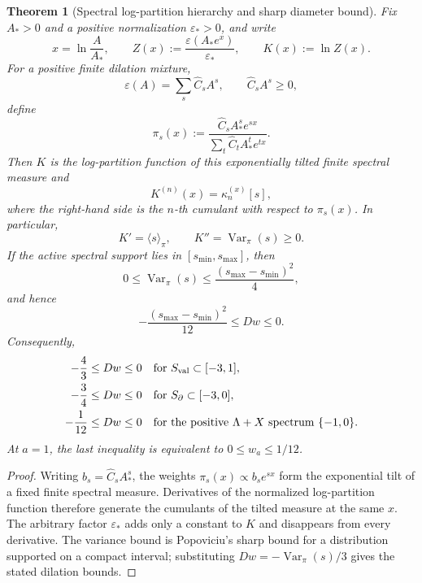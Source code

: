 \documentclass[11pt,a4paper]{article}
\def\Dil{D}%
\numberwithin{equation}{section}
\theoremstyle{definition}
\theoremstyle{plain}
\newtheorem{theorem}[criterion]{Theorem}
\theoremstyle{remark}
\newcommand{\Dil}{\mathscr{D}}
\begin{document}
\begin{theorem}[Spectral log-partition hierarchy and sharp diameter bound]
Fix \(A_*>0\) and a positive normalization \(\varepsilon_*>0\), and write
\begin{equation}
x=\ln\frac{A}{A_*},
\qquad
Z(x):=\frac{\varepsilon(A_*e^x)}{\varepsilon_*},
\qquad
K(x):=\ln Z(x).
\end{equation}
For a positive finite dilation mixture,
\begin{equation}
\varepsilon(A)=\sum_s\widehat C_sA^s,
\qquad
\widehat C_sA^s\ge0,
\end{equation}
define
\begin{equation}
\pi_s(x):=
\frac{\widehat C_sA_*^s e^{sx}}
{\sum_t\widehat C_tA_*^t e^{tx}}.
\end{equation}
Then \(K\) is the log-partition function of this exponentially tilted finite spectral measure and
\begin{equation}
\boxed{
K^{(n)}(x)=\kappa_n^{(x)}[s],
}
\end{equation}
where the right-hand side is the \(n\)-th cumulant with respect to \(\pi_s(x)\). In particular,
\begin{equation}
K'=\langle s\rangle_\pi,
\qquad
K''=\operatorname{Var}_\pi(s)\ge0.
\end{equation}
If the active spectral support lies in \([s_{\min},s_{\max}]\), then
\begin{equation}
0\le\operatorname{Var}_\pi(s)
\le\frac{(s_{\max}-s_{\min})^2}{4},
\end{equation}
and hence
\begin{equation}
-\frac{(s_{\max}-s_{\min})^2}{12}
\le\Dil w\le0.
\end{equation}
Consequently,
\begin{align}
-\frac43&\le\Dil w\le0
&&\text{for }S_{\rm val}\subset[-3,1],\\
-\frac34&\le\Dil w\le0
&&\text{for }S_{\partial}\subset[-3,0],\\
-\frac1{12}&\le\Dil w\le0
&&\text{for the positive }\Lambda+X\text{ spectrum }\{-1,0\}.
\end{align}
At \(a=1\), the last inequality is equivalent to \(0\le w_a\le1/12\).
\end{theorem}
\begin{proof}
Writing \(b_s=\widehat C_sA_*^s\), the weights \(\pi_s(x)\propto b_se^{sx}\) form the exponential tilt of a fixed finite spectral measure. Derivatives of the normalized log-partition function therefore generate the cumulants of the tilted measure at the same \(x\). The arbitrary factor \(\varepsilon_*\) adds only a constant to \(K\) and disappears from every derivative. The variance bound is Popoviciu's sharp bound for a distribution supported on a compact interval; substituting \(\Dil w=-\operatorname{Var}_\pi(s)/3\) gives the stated dilation bounds.
\end{proof}
\end{document}
